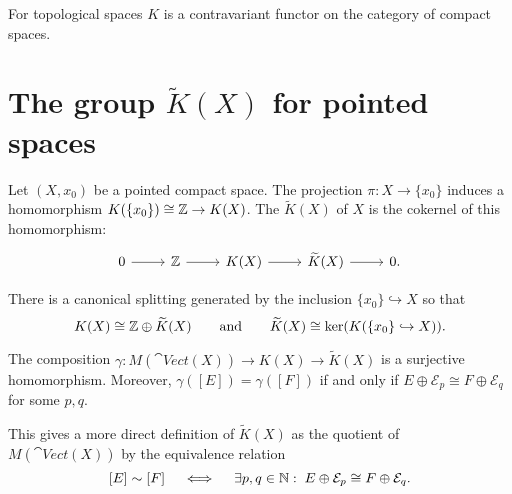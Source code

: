 \begin{proposition}
For topological spaces $K$ is a contravariant functor on the category of compact spaces.
\end{proposition}

\section{The group $\widetilde{K}(X)$ for pointed spaces}
\begin{definition}
Let $(X, x_0)$ be a pointed compact space. The projection $\pi: X\to \{x_0\}$ induces a homomorphism $K(\{x_0\})\cong \mathbb{Z}\to K(X)$. The  $\widetilde{K}(X)$ of $X$ is the cokernel of this homomorphism:
\[ \begin{tikzcd}
0 \rar & \Z \rar & K(X) \rar & \widetilde{K}(X) \rar & 0.
\end{tikzcd} \]
\end{definition}

\begin{lemma}
There is a canonical splitting generated by the inclusion $\{x_0\}\hookrightarrow X$ so that
\[ K(X) \cong \mathbb{Z}\oplus \widetilde{K}(X) \qquad \text{and} \qquad \widetilde{K}(X) \cong\ker(K(\{x_0\}\hookrightarrow X)). \]
\end{lemma}

\begin{proposition}
The composition $\gamma: M(\cat{Vect}(X))\to K(X) \to \widetilde{K}(X)$ is a surjective homomorphism.
Moreover, $\gamma([E])=\gamma([F])$ \textup{if and only if} $E\oplus \mathcal{E}_p \cong F\oplus \mathcal{E}_q$ for some $p,q$.
\end{proposition}
This gives a more direct definition of $\widetilde{K}(X)$ as the quotient of $M(\cat{Vect}(X))$ by the equivalence relation
\[ [E] \sim [F] \quad\iff\quad \exists p,q\in \mathbb{N}:\; E\oplus\mathcal{E}_p \cong F\oplus \mathcal{E}_q.  \]


